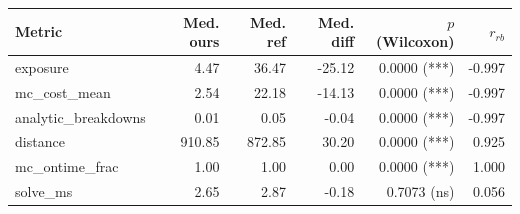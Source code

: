 \begin{tabular}{lrrrrr}
\toprule
Metric & Med. ours & Med. ref & Med. diff & $p$ (Wilcoxon) & $r_{rb}$ \\
\midrule
exposure & 4.47 & 36.47 & -25.12 & 0.0000 (***) & -0.997 \\
mc_cost_mean & 2.54 & 22.18 & -14.13 & 0.0000 (***) & -0.997 \\
analytic_breakdowns & 0.01 & 0.05 & -0.04 & 0.0000 (***) & -0.997 \\
distance & 910.85 & 872.85 & 30.20 & 0.0000 (***) & 0.925 \\
mc_ontime_frac & 1.00 & 1.00 & 0.00 & 0.0000 (***) & 1.000 \\
solve_ms & 2.65 & 2.87 & -0.18 & 0.7073 (ns) & 0.056 \\
\bottomrule
\end{tabular}
